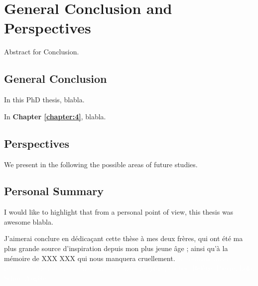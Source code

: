 
\chapter{General Conclusion and Perspectives}
\label{chapter:conclusion}

Abstract for Conclusion.

\graphicspath{{2-Chapters/6-Chapter/Images/}}

\section{General Conclusion}
In this PhD thesis, blabla.

In \textbf{Chapter \ref{chapter:4}}, blabla.


\section{Perspectives}
We present in the following the possible areas of future studies.



\section{Personal Summary}

I would like to highlight that from a personal point of view, this thesis was awesome blabla.


J'aimerai conclure en dédicaçant cette thèse à mes deux frères, qui ont été ma plus grande source d'inspiration depuis mon plus jeune âge ; ainsi qu'à la mémoire de XXX XXX qui nous manquera cruellement.
\textcolor{white}{Je souhaite aussi remercier une fois encore mes amis et amies les plus proches, Hélène, Pierre, Lola, Sélim, Angèle}
